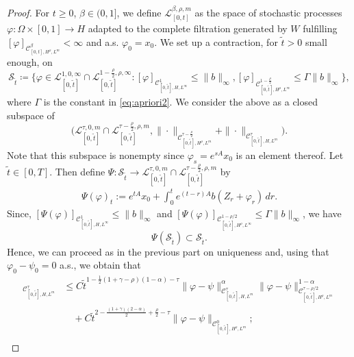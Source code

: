 \documentclass[11pt,a4paper]{article}
\newcommand{\cC}{\mathcal{C}}
\newcommand{\Op}{A}
\newcommand{\cL}{\mathcal{L}}
\renewcommand{\phi}{\varphi}
\renewcommand{\le}{\leqslant}
\numberwithin{equation}{section}
\theoremstyle{definition}
\theoremstyle{remark}
\theoremstyle{plain}
\begin{document}
\begin{proof}
For $t\geqslant 0$, $\beta\in(0,1]$, we define $\cL^{\beta,\rho,m}_{[0,t]}$ as the space of stochastic processes $\phi\colon\Omega\times[0,1]\to H$ adapted to the complete filtration generated by $W$ fulfilling $[\phi]_{\cC^{\beta}_{[0,t],H^\rho,L^m}}<\infty$ and a.s. $\phi_0=x_0$. We set up a contraction, for $\tilde{t}>0$ small enough, on 
\begin{equation*}
\mathcal{S}_{\tilde{t}}\coloneqq\{\phi \in \cL^{1,0,\infty}_{[0,\tilde{t}]}\cap \cL^{1-\frac{\rho}{2},\rho,\infty}_{[0,\tilde{t}]}:[\phi]_{\cC^{1}_{[0,\tilde{t}],H,L^\infty}}\leqslant  \|b\|_\infty,[\phi]_{\cC^{1-\frac{\rho}{2}}_{[0,\tilde{t}],H^\rho,L^\infty}}\leqslant \Gamma\|b\|_\infty\},
\end{equation*}
where $\Gamma$ is the constant in \eqref{eq:apriori2}. We consider the above as a closed subspace of 
\begin{equation*}
\Big(\cL^{\tau,0,m}_{[0,\tilde{t}]}\cap \cL^{\tau-\frac{\rho}{2},\rho,m}_{[0,\tilde{t}]},\|\cdot\|_{\cC^{\tau-\frac{\rho}{2}}_{[0,\tilde{t}],H^\rho,L^m}}+\|\cdot\|_{\cC^{\tau}_{[0,\tilde{t}],H,L^m}}\Big).
\end{equation*}
Note that this subspace is nonempty since $\varphi_s=e^{s\Op}x_0$ is an element thereof. Let $\tilde{t} \in [0,T]$.
Then define $\Psi\colon \mathcal{S}_{\tilde{t}}\to \cL^{\tau,0,m}_{[0,\tilde{t}]}\cap \cL^{\tau-\frac{\rho}{2},\rho,m}_{[0,\tilde{t}]}$ by
\begin{align*}
    \Psi(\phi)_t := e^{t\Op}x_0+\int_0^t e^{(t-r)\Op}b(Z_r+\phi_r) \, dr.
\end{align*}
Since, $[\Psi(\phi)]_{\cC^1_{[0,\tilde{t}],H,L^\infty}}\leqslant \|b\|_\infty$ and $[\Psi(\phi)]_{\cC^{1-\rho/2}_{[0,\tilde{t}],H^\rho,L^\infty}}\leqslant \Gamma\|b\|_\infty$, we have
\begin{equation*}
\Psi(\mathcal{S}_{\tilde{t}})\subset \mathcal{S}_{\tilde{t}}.
\end{equation*}
Hence, we can proceed as in the previous part on uniqueness and, using that $\phi_0-\psi_0=0$ a.s., we obtain that
\begin{align*}
[\Psi(\phi)-\Psi(\psi)]_{\mathcal{C}^{\tau}_{[0,\tilde{t}],H,L^m}}&\le C {\tilde{t}}^{1-\frac12 (1+\gamma-\rho)(1-\alpha)-\tau}\|\phi-\psi\|_{\cC^\tau_{[0,\tilde{t}],H,L^m}}^{\alpha}\|\phi-\psi\|_{\cC^{\tau-\rho/2}_{[0,\tilde{t}],H^
\rho,L^m}}^{1-\alpha}\nonumber\\
&\quad +C  {\tilde{t}}^{2-\frac{(1+\gamma)(2-\alpha)}{2}+\frac\rho2-\tau}  \|\phi-\psi\|_{\cC^0_{[0,\tilde{t}],H^\rho,L^m}};\\

\end{align*}
\end{proof}
\end{document}
